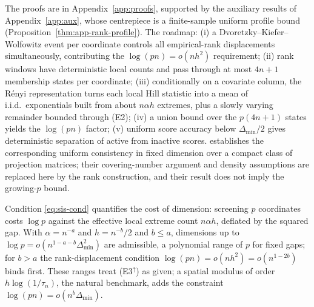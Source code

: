 The proofs are in Appendix~\ref{app:proofs}, supported by the auxiliary
results of Appendix~\ref{app:aux}, whose centrepiece is a finite-sample
uniform profile bound (Proposition~\ref{thm:app-rank-profile}). The
roadmap: (i) a Dvoretzky--Kiefer--Wolfowitz event per coordinate controls
all empirical-rank displacements simultaneously, contributing the
$\log(pn)=o(nh^2)$ requirement; (ii) rank windows have deterministic
local counts and pass through at most $4n+1$ membership states per
coordinate; (iii) conditionally on a covariate column, the R\'enyi
representation turns each local Hill statistic into a mean of
i.i.d.\ exponentials built from about $n\alpha h$ extremes, plus a
slowly varying remainder bounded through (E2); (iv) a union bound over
the $p(4n+1)$ states yields the $\log(pn)$ factor; (v) uniform score
accuracy below $\Delta_{\min}/2$ gives deterministic separation of
active from inactive scores. \citet[Theorem~3]{gardesPodgorny2025}
establishes the corresponding uniform consistency in fixed dimension
over a compact class of projection matrices; their covering-number
argument and density assumptions are replaced here by the rank
construction, and their result does not imply the growing-$p$ bound.

Condition \eqref{eq:sis-cond} quantifies the cost of dimension:
screening $p$ coordinates costs $\log p$ against the effective local
extreme count $n\alpha h$, deflated by the squared gap. With
$\alpha=n^{-a}$ and $h=n^{-b}/2$ and $b\le a$, dimensions up to
$\log p=o(n^{1-a-b}\Delta_{\min}^2)$ are admissible, a polynomial range
of $p$ for fixed gaps; for $b>a$ the rank-displacement condition
$\log(pn)=o(nh^2)=o(n^{1-2b})$ binds first. These ranges treat (E3$^{\uparrow}$) as given; a spatial modulus of order
$h\log(1/\tau_n)$, the natural benchmark, adds the constraint
$\log(pn)=o(n^{b}\Delta_{\min})$.
